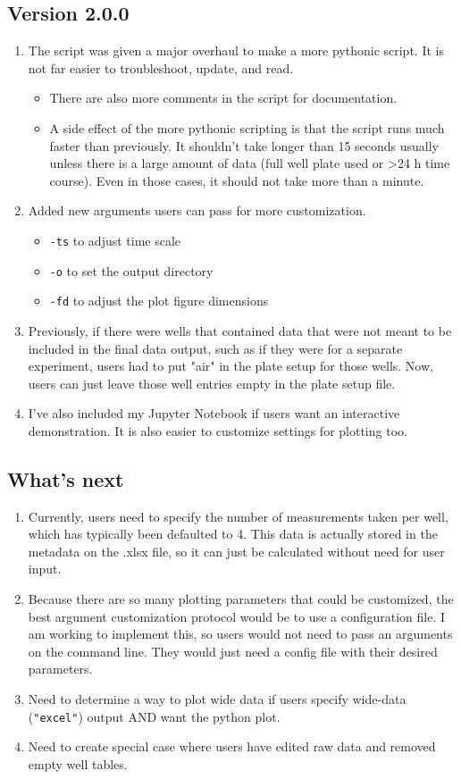 \documentclass[12pt]{article}
\begin{document}
\subsection*{Version 2.0.0}
\label{sec:orgcfbbda6}
\begin{enumerate}
\item The script was given a major overhaul to make a more pythonic script. It is not far easier to troubleshoot, update, and read.
\begin{itemize}
\item There are also more comments in the script for documentation.
\item A side effect of the more pythonic scripting is that the script runs much faster than previously. It shouldn't take longer than 15 seconds usually unless there is a large amount of data (full well plate used or >24 h time course). Even in those cases, it should not take more than a minute.
\end{itemize}
\item Added new arguments users can pass for more customization.
\begin{itemize}
\item \texttt{-ts} to adjust time scale
\item \texttt{-o} to set the output directory
\item \texttt{-fd} to adjust the plot figure dimensions
\end{itemize}
\item Previously, if there were wells that contained data that were not meant to be included in the final data output, such as if they were for a separate experiment, users had to put "air" in the plate setup for those wells. Now, users can just leave those well entries empty in the plate setup file.
\item I've also included my Jupyter Notebook if users want an interactive demonstration. It is also easier to customize settings for plotting too.
\end{enumerate}
\subsection*{What's next}
\label{sec:orgf78653d}
\begin{enumerate}
\item Currently, users need to specify the number of measurements taken per well, which has typically been defaulted to 4. This data is actually stored in the metadata on the .xlsx file, so it can just be calculated without need for user input.
\item Because there are so many plotting parameters that could be customized, the best argument customization protocol would be to use a configuration file. I am working to implement this, so users would not need to pass an arguments on the command line. They would just need a config file with their desired parameters.
\item Need to determine a way to plot wide data if users specify wide-data (\texttt{"excel"}) output AND want the python plot.
\item Need to create special case where users have edited raw data and removed empty well tables.
\end{enumerate}
\end{document}
